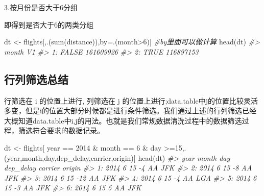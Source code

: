 \documentclass[
]{book}
\newenvironment{Shaded}{\begin{snugshade}}{\end{snugshade}}
\newcommand{\CommentTok}[1]{\textcolor[rgb]{0.56,0.35,0.01}{\textit{#1}}}
\newcommand{\DecValTok}[1]{\textcolor[rgb]{0.00,0.00,0.81}{#1}}
\newcommand{\FunctionTok}[1]{\textcolor[rgb]{0.00,0.00,0.00}{#1}}
\newcommand{\NormalTok}[1]{#1}
\newcommand{\OtherTok}[1]{\textcolor[rgb]{0.56,0.35,0.01}{#1}}
\newcommand{\SpecialCharTok}[1]{\textcolor[rgb]{0.00,0.00,0.00}{#1}}
\begin{document}
3.按月份是否大于6分组

即得到是否大于6的两类分组

\begin{Shaded}
\begin{Highlighting}[]
\NormalTok{dt }\OtherTok{\textless{}{-}}\NormalTok{ flights[,.(}\FunctionTok{sum}\NormalTok{(distance)),by}\OtherTok{=}\NormalTok{.(month}\SpecialCharTok{\textgreater{}}\DecValTok{6}\NormalTok{)] }\CommentTok{\#by里面可以做计算}
\FunctionTok{head}\NormalTok{(dt)}
\CommentTok{\#\textgreater{}    month        V1}
\CommentTok{\#\textgreater{} 1: FALSE 161609926}
\CommentTok{\#\textgreater{} 2:  TRUE 116897153}
\end{Highlighting}
\end{Shaded}

\hypertarget{ux884cux5217ux7b5bux9009ux603bux7ed3}{%
\subsection{行列筛选总结}\label{ux884cux5217ux7b5bux9009ux603bux7ed3}}

行筛选在 i 的位置上进行, 列筛选在 j 的位置上进行;data.table中j的位置比较灵活多变，但是i的位置大部分时候都是进行条件筛选。我们通过上述的行列筛选已经大概知道data.table中i,j的用法。也就是我们常规数据清洗过程中的数据筛选过程，筛选符合要求的数据记录。

\begin{Shaded}
\begin{Highlighting}[]

\NormalTok{dt }\OtherTok{\textless{}{-}}\NormalTok{ flights[ year }\SpecialCharTok{==} \DecValTok{2014} \SpecialCharTok{\&}\NormalTok{ month }\SpecialCharTok{==} \DecValTok{6} \SpecialCharTok{\&}\NormalTok{ day }\SpecialCharTok{\textgreater{}=}\DecValTok{15}\NormalTok{,.(year,month,day,dep\_delay,carrier,origin)] }
\FunctionTok{head}\NormalTok{(dt)}
\CommentTok{\#\textgreater{}    year month day dep\_delay carrier origin}
\CommentTok{\#\textgreater{} 1: 2014     6  15        {-}4      AA    JFK}
\CommentTok{\#\textgreater{} 2: 2014     6  15        {-}8      AA    JFK}
\CommentTok{\#\textgreater{} 3: 2014     6  15       {-}12      AA    JFK}
\CommentTok{\#\textgreater{} 4: 2014     6  15        {-}4      AA    LGA}
\CommentTok{\#\textgreater{} 5: 2014     6  15        {-}3      AA    JFK}
\CommentTok{\#\textgreater{} 6: 2014     6  15         5      AA    JFK}
\end{Highlighting}
\end{Shaded}
\end{document}
